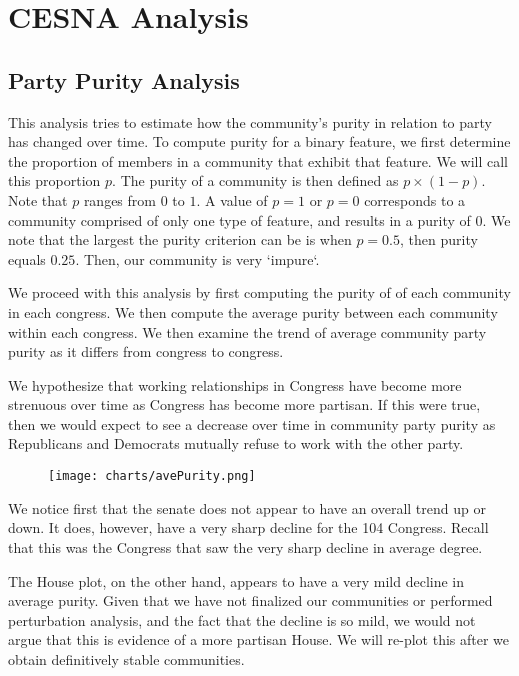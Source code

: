 \section{CESNA Analysis}

\subsection{Party Purity Analysis}

This analysis tries to estimate how the community's purity in relation to party
has changed over time. To compute purity for a binary feature, we first
determine the proportion of members in a community that exhibit that feature. We
will call this proportion $p$. The purity of a community is then defined as $p
\times (1 - p)$. Note that $p$ ranges from $0$ to $1$. A value of $p = 1$ or $p
= 0$ corresponds to a community comprised of only one type of feature, and
results in a purity of $0$. We note that the largest the purity criterion can be
is when $p = 0.5$, then purity equals $0.25$. Then, our community is very
`impure`.

We proceed with this analysis by first computing the purity of of each community
in each congress. We then compute the average purity between each community
within each congress. We then examine the trend of average community party
purity as it differs from congress to congress.

We hypothesize that working relationships in Congress have become more strenuous
over time as Congress has become more partisan. If this were true, then we would
expect to see a decrease over time in community party purity as Republicans and
Democrats mutually refuse to work with the other party.

\begin{figure}[h!]
    \texttt{[image: charts/avePurity.png]}
\end{figure}

We notice first that the senate does not appear to have an overall trend up or
down. It does, however, have a very sharp decline for the 104 Congress. Recall
that this was the Congress that saw the very sharp decline in average degree.

The House plot, on the other hand, appears to have a very mild decline in
average  purity. Given that we have not finalized our communities or performed
perturbation analysis, and the fact that the decline is so mild, we would not
argue that this is evidence of a more partisan House. We will re-plot this after 
we obtain definitively stable communities.